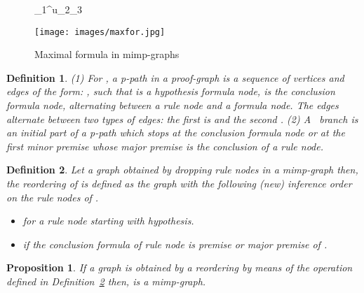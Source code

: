 \documentclass[submission,copyright,creativecommons]{eptcs}
\newtheorem{definition}{Definition}
\newtheorem{proposition}{Proposition}
\begin{document}
\begin{figure}[h]
\begin{center}
\begin{minipage}{6cm}

 \Pi_1\alpha[\alpha]^u\Pi_2\betau\alpha\to\beta\beta\Pi_3  
\end{minipage}
\begin{minipage}{7cm}
\texttt{[image: images/maxfor.jpg]}
\end{minipage}
\caption{Maximal formula in mimp-graphs}
\label{maxforfig}

\end{center}
\end{figure}



\begin{definition}
\label{defbranch} (1) For , a \emph{p-path} in a proof-graph is a
sequence of vertices and edges of the form: , such that  is a hypothesis formula node,  is the
conclusion formula node,  alternating between a rule node and a formula
node. The edges  alternate between two types of edges: the first is  and the second . (2) A \emph{\ branch} is an
initial part of a \emph{p-path} which stops at the conclusion formula node
or at the first minor premise whose major premise is the conclusion of a
rule node.
\end{definition}

\begin{definition}
\label{defReorder} Let  a graph obtained by dropping rule nodes in a
mimp-graph then, the reordering of  is defined as the graph  with the
following (new) inference order on the rule nodes of .



\begin{itemize}
\item   for a rule node  starting with hypothesis.

\item   if the conclusion formula of rule node  is premise or major premise of .
\end{itemize}
\end{definition}

\begin{proposition}
\label{prop} If a graph  is obtained by a reordering by means of the
operation defined in Definition~\ref{defReorder} then,  is a mimp-graph.
\end{proposition}
\end{document}
